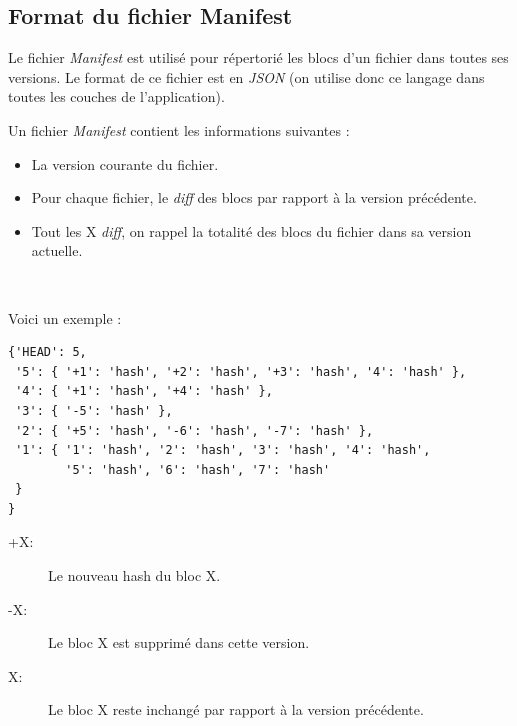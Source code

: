 \subsection{Format du fichier Manifest}

Le fichier \textit{Manifest} est utilisé pour répertorié les blocs d'un fichier dans toutes ses versions.
Le format de ce fichier est en \textit{JSON} (on utilise donc ce langage dans toutes les couches de l'application).

Un fichier \textit{Manifest} contient les informations suivantes :

\begin{itemize}
     \item La version courante du fichier.
     \item Pour chaque fichier, le \textit{diff} des blocs par rapport à la version précédente.
     \item Tout les X \textit{diff}, on rappel la totalité des blocs du fichier dans sa version actuelle.
\end{itemize} ~ \newline

Voici un exemple :

\begin{verbatim}
{'HEAD': 5,
 '5': { '+1': 'hash', '+2': 'hash', '+3': 'hash', '4': 'hash' },
 '4': { '+1': 'hash', '+4': 'hash' },
 '3': { '-5': 'hash' },
 '2': { '+5': 'hash', '-6': 'hash', '-7': 'hash' },
 '1': { '1': 'hash', '2': 'hash', '3': 'hash', '4': 'hash',
        '5': 'hash', '6': 'hash', '7': 'hash'
 }
}
\end{verbatim}

\begin{description}
     \item[+X:] Le nouveau hash du bloc X.
     \item[-X:] Le bloc X est supprimé dans cette version.
     \item[X:] Le bloc X reste inchangé par rapport à la version précédente.
\end{description}
